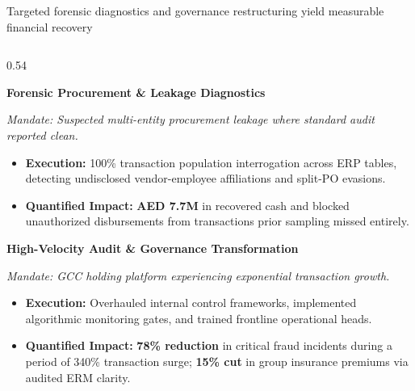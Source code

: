 \documentclass[aspectratio=169, 8pt]{beamer}
\begin{document}
\begin{frame}{Targeted forensic diagnostics and governance restructuring yield measurable financial recovery}
    \vspace{-0.2cm}
    \begin{columns}[T]
        \begin{column}{0.54\textwidth}
            \begin{tcolorbox}[colback=cardBg, colframe=cardBorder, arc=1pt, boxrule=0.5pt, left=3pt, right=3pt, top=1.5pt, bottom=1.5pt]
                \textbf{\small \color{terracotta} Forensic Procurement \& Leakage Diagnostics}
            \end{tcolorbox}
            \vspace{-0.08cm}
            \textit{\scriptsize \color{textMuted} Mandate: Suspected multi-entity procurement leakage where standard audit reported clean.}
            \begin{itemize}
                \setlength{\itemsep}{0.5pt}
                \item \textbf{Execution:} 100\% transaction population interrogation across ERP tables, detecting undisclosed vendor-employee affiliations and split-PO evasions.
                \item \textbf{\color{terracotta} Quantified Impact:} \textbf{AED 7.7M} in recovered cash and blocked unauthorized disbursements from transactions prior sampling missed entirely.
            \end{itemize}
            
            \vspace{0.05cm}
            \begin{tcolorbox}[colback=cardBg, colframe=cardBorder, arc=1pt, boxrule=0.5pt, left=3pt, right=3pt, top=1.5pt, bottom=1.5pt]
                \textbf{\small \color{terracotta} High-Velocity Audit \& Governance Transformation}
            \end{tcolorbox}
            \vspace{-0.08cm}
            \textit{\scriptsize \color{textMuted} Mandate: GCC holding platform experiencing exponential transaction growth.}
            \begin{itemize}
                \setlength{\itemsep}{0.5pt}
                \item \textbf{Execution:} Overhauled internal control frameworks, implemented algorithmic monitoring gates, and trained frontline operational heads.
                \item \textbf{\color{terracotta} Quantified Impact:} \textbf{78\% reduction} in critical fraud incidents during a period of 340\% transaction surge; \textbf{15\% cut} in group insurance premiums via audited ERM clarity.
            \end{itemize}
        \end{column}
        

\end{columns}
\end{frame}
\end{document}
